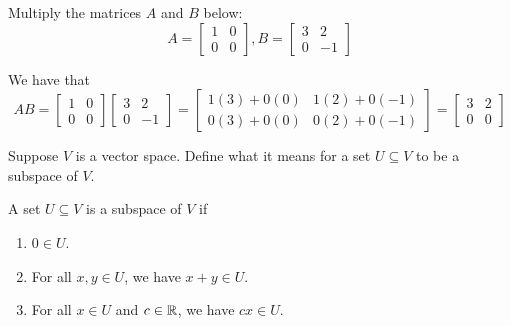 \documentclass[mathshortcuts, noboxsols]{homework}
\begin{document}
		\maketitle

		\begin{problem}
				Multiply the matrices $A$ and $B$ below:
				\begin{equation*}
						A = \begin{bmatrix}
								1 & 0 \\ 0 & 0
						\end{bmatrix}, B = \begin{bmatrix}
								3 & 2 \\ 0 & -1
						\end{bmatrix}
				\end{equation*}
		\end{problem}
		\begin{soln}
				 We have that 
				 \begin{equation*}
				 		AB = \begin{bmatrix}
								1 & 0 \\ 0 & 0
						\end{bmatrix}\begin{bmatrix}
								3 & 2 \\ 0 & -1
						\end{bmatrix} = \begin{bmatrix}
								1(3) + 0(0) & 1(2) + 0(-1)  \\ 
								0(3) + 0(0) & 0(2) + 0(-1)
						\end{bmatrix} = \begin{bmatrix}
								3 & 2 \\ 0 & 0
						\end{bmatrix}
				 \end{equation*}
		\end{soln}

		\begin{problem}
				Suppose $V$ is a vector space. Define what it means for a set $U \subseteq V$ to be a subspace of $V$.
		\end{problem}
		\begin{soln}
				A set $U \subseteq V$ is a subspace of $V$ if
				\begin{enumerate}
						\item $0\in U$. 
						\item For all $x,y\in U$, we have $x+y\in U$. 
						\item For all $x\in U$ and $c\in \mathbb{R}$, we have $cx \in U$.
				\end{enumerate}
		\end{soln}
\end{document}
